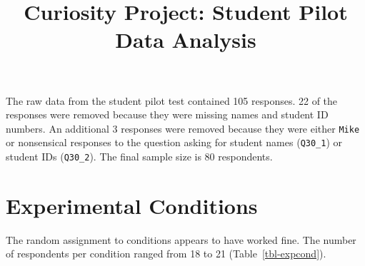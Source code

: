 \documentclass[
  letterpaper,
  DIV=11,
  numbers=noendperiod]{scrartcl}
\title{Curiosity Project: Student Pilot Data Analysis}
\author{}
\date{}
\renewcommand*\contentsname{Table of contents}
\newcommand\contentsname{Table of contents}
\begin{document}
\maketitle


\renewcommand*\contentsname{Table of contents}
{
\hypersetup{linkcolor=}
\setcounter{tocdepth}{3}
\tableofcontents
}

The raw data from the student pilot test contained 105 responses. 22 of
the responses were removed because they were missing names and student
ID numbers. An additional 3 responses were removed because they were
either \texttt{Mike} or nonsensical responses to the question asking for
student names (\texttt{Q30\_1}) or student IDs (\texttt{Q30\_2}). The
final sample size is 80 respondents.

\section{Experimental Conditions}\label{experimental-conditions}

The random assignment to conditions appears to have worked fine. The
number of respondents per condition ranged from 18 to 21
(Table~\ref{tbl-expcond}).

\begin{table}

\caption{\label{tbl-expcond}Number of respondents in the control and
experimental conditions.}


\end{table}%
\end{document}
